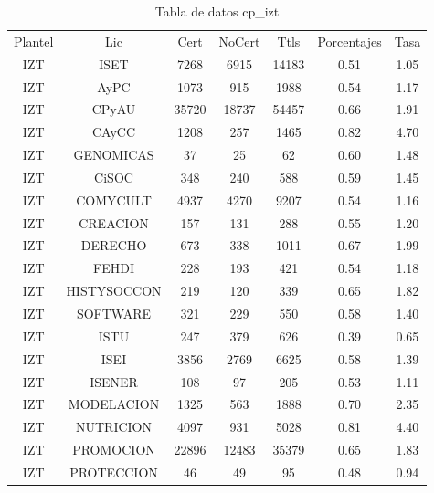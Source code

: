 \documentclass{article}
\begin{document}
\begin{table}[h]
\centering
\begin{tabular}{ccccccc}

Plantel & Lic & Cert & NoCert & Ttls & Porcentajes & Tasa \\

IZT & ISET & 7268 & 6915 & 14183 & 0.51 & 1.05 \\
IZT & AyPC & 1073 & 915 & 1988 & 0.54 & 1.17 \\
IZT & CPyAU & 35720 & 18737 & 54457 & 0.66 & 1.91 \\
IZT & CAyCC & 1208 & 257 & 1465 & 0.82 & 4.70 \\
IZT & GENOMICAS & 37 & 25 & 62 & 0.60 & 1.48 \\
IZT & CiSOC & 348 & 240 & 588 & 0.59 & 1.45 \\
IZT & COMYCULT & 4937 & 4270 & 9207 & 0.54 & 1.16 \\
IZT & CREACION & 157 & 131 & 288 & 0.55 & 1.20 \\
IZT & DERECHO & 673 & 338 & 1011 & 0.67 & 1.99 \\
IZT & FEHDI & 228 & 193 & 421 & 0.54 & 1.18 \\
IZT & HISTYSOCCON & 219 & 120 & 339 & 0.65 & 1.82 \\
IZT & SOFTWARE & 321 & 229 & 550 & 0.58 & 1.40 \\
IZT & ISTU & 247 & 379 & 626 & 0.39 & 0.65 \\
IZT & ISEI & 3856 & 2769 & 6625 & 0.58 & 1.39 \\
IZT & ISENER & 108 & 97 & 205 & 0.53 & 1.11 \\
IZT & MODELACION & 1325 & 563 & 1888 & 0.70 & 2.35 \\
IZT & NUTRICION & 4097 & 931 & 5028 & 0.81 & 4.40 \\
IZT & PROMOCION & 22896 & 12483 & 35379 & 0.65 & 1.83 \\
IZT & PROTECCION & 46 & 49 & 95 & 0.48 & 0.94 \\

\end{tabular}
\caption{Tabla de datos cp\_izt}
\end{table}
\end{document}

